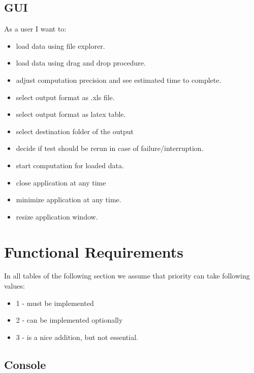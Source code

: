\documentclass{article}
\begin{document}
\subsection{GUI}
As a user I want to:
\begin{itemize}
	\item
		load data using file explorer.
	\item
		load data using drag and drop procedure.
	\item
		adjust computation precision and see estimated time to complete.
	\item
		select output format as .xls file.
	\item
		select output format as latex table.
	\item
		select destination folder of the output
	\item
		decide if test should be rerun in case of failure/interruption.
	\item 
		start computation for loaded data.
	\item
		close application at any time
	\item
		minimize application at any time.
	\item 
		resize application window.
\end{itemize}



\section{Functional Requirements}
In all tables of the following section we assume that priority can take following values:
\begin{itemize} 
	\item 1 - must be implemented
	\item 2 - can be implemented optionally 
	\item 3 - is a nice addition, but not essential.
\end{itemize} 


\subsection{Console} \label{console_func_req}
\end{document}
